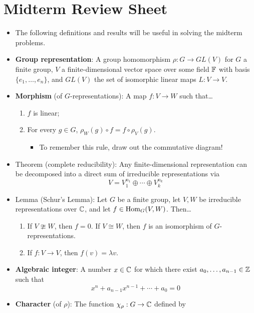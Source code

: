 \documentclass[../notes.tex]{subfiles}
\begin{document}
\section{Midterm Review Sheet}
\begin{itemize}
    \item {}The following definitions and results will be useful in solving the midterm problems.
    \item \textbf{Group representation}: A group homomorphism $\rho:G\to GL(V)$ for $G$ a finite group, $V$ a finite-dimensional vector space over some field $\mathbb{F}$ with basis $\{e_1,\dots,e_n\}$, and $GL(V)$ the set of isomorphic linear maps $L:V\to V$.
    \item \textbf{Morphism} (of $G$-representations): A map $f:V\to W$ such that\dots
    \begin{enumerate}
        \item $f$ is linear;
        \item For every $g\in G$, $\rho_W(g)\circ f=f\circ\rho_V(g)$.
        \begin{itemize}
            \item To remember this rule, draw out the commutative diagram!
        \end{itemize}
    \end{enumerate}
    \item Theorem (complete reducibility): Any finite-dimensional representation can be decomposed into a direct sum of irreducible representations via
    \begin{equation*}
        V = V_1^{n_1}\oplus\cdots\oplus V_k^{n_k}
    \end{equation*}
    \item Lemma (Schur's Lemma): Let $G$ be a finite group, let $V,W$ be irreducible representations over $\mathbb{C}$, and let $f\in\operatorname{Hom}_G(V,W)$. Then\dots
    \begin{enumerate}
        \item If $V\ncong W$, then $f=0$. If $V\cong W$, then $f$ is an isomorphism of $G$-representations.
        \item If $f:V\to V$, then $f(v)=\lambda v$.
    \end{enumerate}
    \item \textbf{Algebraic integer}: A number $x\in\mathbb{C}$ for which there exist $a_0,\dots,a_{n-1}\in\mathbb{Z}$ such that
    \begin{equation*}
        x^n+a_{n-1}x^{n-1}+\cdots+a_0 = 0
    \end{equation*}
    \item \textbf{Character} (of $\rho$): The function $\chi_\rho:G\to\mathbb{C}$ defined by

\end{itemize}
\end{document}
